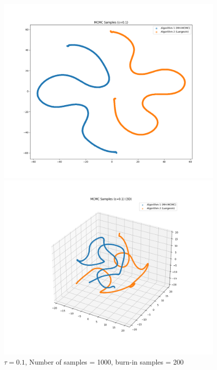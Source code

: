 \documentclass[a4paper,12pt]{article}
\begin{document}
\begin{figure}[H]
  \centering
  \begin{minipage}{0.38\textwidth}
    \includegraphics[width=\linewidth]{TASK-0-1/images/samples_eps0.1_n1000_burn200_tsne_2d.png}
  \end{minipage}
  \hfill
  \begin{minipage}{0.38\textwidth}
    \includegraphics[width=\linewidth]{TASK-0-1/images/samples_eps0.1_n1000_burn200_tsne_3d.png}
  \end{minipage}
  \caption{$\tau = 0.1$, Number of samples = 1000, burn-in samples = 200}
\end{figure}
\end{document}
